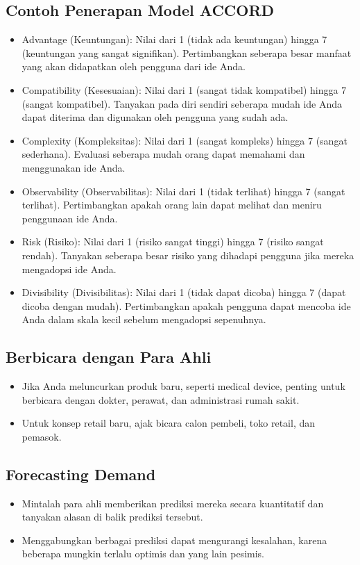 \documentclass{article}
\begin{document}
\subsection{Contoh Penerapan Model ACCORD}
\begin{itemize}
    \item Advantage (Keuntungan): Nilai dari 1 (tidak ada keuntungan) hingga 7 (keuntungan yang sangat signifikan). Pertimbangkan seberapa besar manfaat yang akan didapatkan oleh pengguna dari ide Anda.
    \item Compatibility (Kesesuaian): Nilai dari 1 (sangat tidak kompatibel) hingga 7 (sangat kompatibel). Tanyakan pada diri sendiri seberapa mudah ide Anda dapat diterima dan digunakan oleh pengguna yang sudah ada.
    \item Complexity (Kompleksitas): Nilai dari 1 (sangat kompleks) hingga 7 (sangat sederhana). Evaluasi seberapa mudah orang dapat memahami dan menggunakan ide Anda.
    \item Observability (Observabilitas): Nilai dari 1 (tidak terlihat) hingga 7 (sangat terlihat). Pertimbangkan apakah orang lain dapat melihat dan meniru penggunaan ide Anda.
    \item Risk (Risiko): Nilai dari 1 (risiko sangat tinggi) hingga 7 (risiko sangat rendah). Tanyakan seberapa besar risiko yang dihadapi pengguna jika mereka mengadopsi ide Anda.
    \item Divisibility (Divisibilitas): Nilai dari 1 (tidak dapat dicoba) hingga 7 (dapat dicoba dengan mudah). Pertimbangkan apakah pengguna dapat mencoba ide Anda dalam skala kecil sebelum mengadopsi sepenuhnya.
\end{itemize}

\subsection{Berbicara dengan Para Ahli}
\begin{itemize}
    \item Jika Anda meluncurkan produk baru, seperti medical device, penting untuk berbicara dengan dokter, perawat, dan administrasi rumah sakit.
    \item Untuk konsep retail baru, ajak bicara calon pembeli, toko retail, dan pemasok.
\end{itemize}

\subsection{Forecasting Demand}
\begin{itemize}
    \item Mintalah para ahli memberikan prediksi mereka secara kuantitatif dan tanyakan alasan di balik prediksi tersebut.
    \item Menggabungkan berbagai prediksi dapat mengurangi kesalahan, karena beberapa mungkin terlalu optimis dan yang lain pesimis.
\end{itemize}
\end{document}
